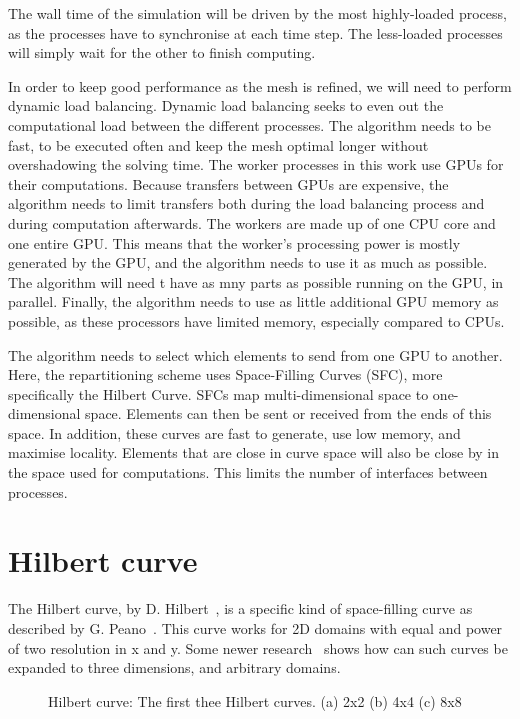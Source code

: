 The wall time of the simulation will be driven by the most highly-loaded process, as the processes
have to synchronise at each time step. The less-loaded processes will simply wait for the other to
finish computing.

In order to keep good performance as the mesh is refined, we will need to perform dynamic load
balancing. Dynamic load balancing seeks to even out the computational load between the different
processes. The algorithm needs to be fast, to be executed often and keep the mesh optimal longer
without overshadowing the solving time. The worker processes in this work use GPUs for their
computations. Because transfers between GPUs are expensive, the algorithm needs to limit transfers
both during the load balancing process and during computation afterwards. The workers are made up of
one CPU core and one entire GPU. This means that the worker's processing power is mostly generated
by the GPU, and the algorithm needs to use it as much as possible. The algorithm will need t have
as mny parts as possible running on the GPU, in parallel. Finally, the algorithm needs to use as
little additional GPU memory as possible, as these processors have limited memory, especially
compared to CPUs.

The algorithm needs to select which elements to send from one GPU to another. Here, the
repartitioning scheme uses Space-Filling Curves (SFC), more specifically the Hilbert Curve. SFCs map
multi-dimensional space to one-dimensional space. Elements can then be sent or received from the
ends of this space. In addition, these curves are fast to generate, use low memory, and maximise
locality. Elements that are close in curve space will also be close by in the space used for
computations. This limits the number of interfaces between processes.

\section{Hilbert curve} \label{section:load_balancing:hilbert_curve}
The Hilbert curve, by D. Hilbert~\cite{Hilbert1891}, is a specific kind of space-filling curve as
described by G. Peano~\cite{Peano1890}. This curve works for 2D domains with equal and power of two
resolution in x and y. Some newer research~\cite{Haverkort2011} shows how can such curves be
expanded to three dimensions, and arbitrary domains.

\begin{figure}[H]
	\centering
	\hfill
	\hfill
	\caption{Hilbert curve: The first thee Hilbert curves. (a) 2x2 (b) 4x4 (c) 8x8}
	\label{fig:hilbert_curves}
\end{figure}

